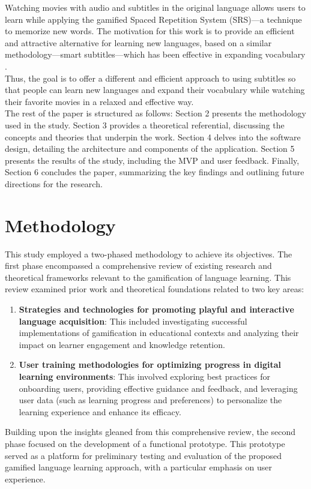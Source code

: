 \documentclass[12pt]{article}
\begin{document}
Watching movies with audio and subtitles in the original language allows users to learn while applying the gamified Spaced Repetition System (SRS)—a technique to memorize new words. The motivation for this work is to provide an efficient and attractive alternative for learning new languages, based on a similar methodology—smart subtitles—which has been effective in expanding vocabulary \cite{Kovacs14}.\\
Thus, the goal is to offer a different and efficient approach to using subtitles so that people can learn new languages and expand their vocabulary while watching their favorite movies in a relaxed and effective way. \\
The rest of the paper is structured as follows: Section 2 presents the methodology used in the study. Section 3 provides a theoretical referential, discussing the concepts and theories that underpin the work. Section 4 delves into the software design, detailing the architecture and components of the application. Section 5 presents the results of the study, including the MVP and user feedback. Finally, Section 6 concludes the paper, summarizing the key findings and outlining future directions for the research.

\section{Methodology}
This study employed a two-phased methodology to achieve its objectives. The first phase encompassed a comprehensive review of existing research and theoretical frameworks relevant to the gamification of language learning. This review examined prior work and theoretical foundations related to two key areas:
\begin{enumerate}
    \item \textbf{Strategies and technologies for promoting playful and interactive language acquisition}: This included investigating successful implementations of gamification in educational contexts and analyzing their impact on learner engagement and knowledge retention.
    \item \textbf{User training methodologies for optimizing progress in digital learning environments}: This involved exploring best practices for onboarding users, providing effective guidance and feedback, and leveraging user data (such as learning progress and preferences) to personalize the learning experience and enhance its efficacy.
\end{enumerate}
Building upon the insights gleaned from this comprehensive review, the second phase focused on the development of a functional prototype. This prototype served as a platform for preliminary testing and evaluation of the proposed gamified language learning approach, with a particular emphasis on user experience. 
\end{document}
